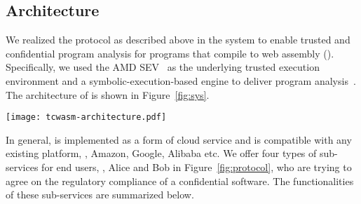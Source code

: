 \subsection{Architecture}
\label{subsec:architecture}
We realized the \tcpa protocol as described above in the \tool system to enable 
trusted and confidential program analysis for programs that compile to web assembly (\wasm). 
Specifically, we used the AMD SEV~\cite{sev2020strengthening} as the underlying trusted execution 
environment and a symbolic-execution-based engine to deliver program analysis~\cite{yang2020seraph}. 
The architecture of \tool is shown in Figure~\ref{fig:sys}. 

\begin{figure*}[h]
\centering
\texttt{[image: tcwasm-architecture.pdf]}
\caption{\label{fig:sys}The architecture of \tool.}	
\end{figure*}

In general, \tool is implemented as a form of cloud service and is compatible with any existing 
platform, \eg, Amazon, Google, Alibaba etc. We offer four types of sub-services for 
end users, \eg, Alice and Bob in Figure~\ref{fig:protocol}, who are trying to agree on the 
regulatory compliance of a confidential software. The functionalities of these sub-services 
are summarized below.

